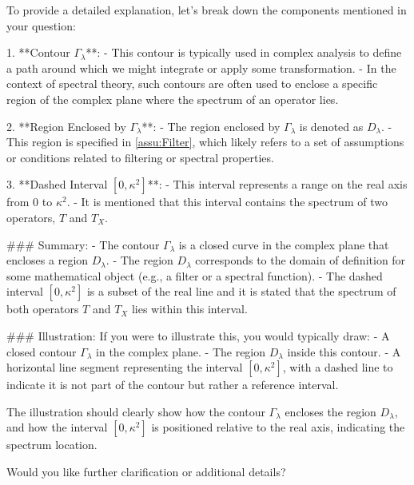 To provide a detailed explanation, let's break down the components mentioned in your question:

1. **Contour \(\Gamma_\lambda\)**:
   - This contour is typically used in complex analysis to define a path around which we might integrate or apply some transformation.
   - In the context of spectral theory, such contours are often used to enclose a specific region of the complex plane where the spectrum of an operator lies.

2. **Region Enclosed by \(\Gamma_\lambda\)**:
   - The region enclosed by \(\Gamma_\lambda\) is denoted as \(D_\lambda\).
   - This region is specified in \cref{assu:Filter}, which likely refers to a set of assumptions or conditions related to filtering or spectral properties.

3. **Dashed Interval \([0, \kappa^2]\)**:
   - This interval represents a range on the real axis from 0 to \(\kappa^2\).
   - It is mentioned that this interval contains the spectrum of two operators, \(T\) and \(T_X\).

### Summary:
- The contour \(\Gamma_\lambda\) is a closed curve in the complex plane that encloses a region \(D_\lambda\).
- The region \(D_\lambda\) corresponds to the domain of definition for some mathematical object (e.g., a filter or a spectral function).
- The dashed interval \([0, \kappa^2]\) is a subset of the real line and it is stated that the spectrum of both operators \(T\) and \(T_X\) lies within this interval.

### Illustration:
If you were to illustrate this, you would typically draw:
- A closed contour \(\Gamma_\lambda\) in the complex plane.
- The region \(D_\lambda\) inside this contour.
- A horizontal line segment representing the interval \([0, \kappa^2]\), with a dashed line to indicate it is not part of the contour but rather a reference interval.

The illustration should clearly show how the contour \(\Gamma_\lambda\) encloses the region \(D_\lambda\), and how the interval \([0, \kappa^2]\) is positioned relative to the real axis, indicating the spectrum location.

Would you like further clarification or additional details?